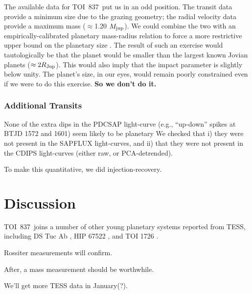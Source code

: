 \documentclass[12pt,twocolumn,tighten]{aastex63}
\newcommand{\tn}{TOI~837} %
\begin{document}
The available data for \tn\ put us in an odd position. The transit
data provide a minimum size due to the grazing geometry; the radial
velocity data provide a maximum mass ($\approx$1.20 $M_{\rm jup}$).
We could combine the two with an empirically-calibrated planetary
mass-radius relation to force a more restrictive upper bound on the
planetary size \citep[{\it e.g.},][]{chen_probabilistic_2016}.  The
result of such an exercise would tautologically be that the planet
would be smaller than the largest known Jovian planets ($\approx
2R_{\rm Jup}$).  This would also imply that the impact parameter is
slightly below unity.  The planet's size, in our eyes, would remain
poorly constrained even if we were to do this exercise. {\bf So we
don't do it.}


\subsubsection{Additional Transits}
None of the extra dips in the PDCSAP light-curve (e.g., ``up-down''
spikes at BTJD 1572 and 1601) seem likely to be planetary
We checked that i) they were not present in the SAPFLUX light-curves,
and ii) that they were not present in the CDIPS light-curves (either
raw, or PCA-detrended).

To make this quantitative, we did injection-recovery.



\section{Discussion}
\label{sec:discussion}

\tn\ joins a number of other young planetary systems reported from
TESS, including DS Tuc Ab \citep{newton_tess_2019}, HIP 67522
\citep{rizzuto_tess_2020}, and TOI 1726 \citep{mann_tess_2020}.

Rossiter measurements will confirm.

After, a mass measurement should be worthwhile.

We'll get more TESS data in January(?).




\end{document}
